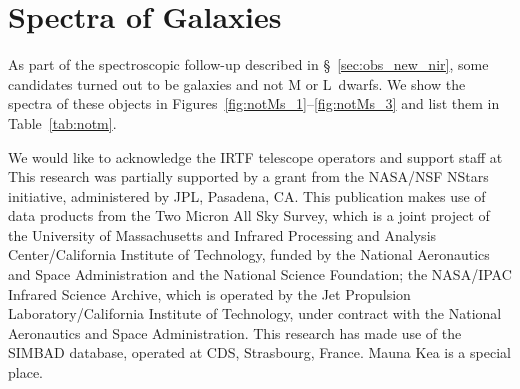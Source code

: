 \documentclass[12pt,preprint]{aastex}
\begin{document}
% 


\appendix
\section{Spectra of Galaxies}
\label{sec:galaxies}
As part of the spectroscopic follow-up described in \S~\ref{sec:obs_new_nir}, some candidates turned out to be galaxies and not M or L~dwarfs. We show the spectra of these objects in Figures~\ref{fig:notMs_1}--\ref{fig:notMs_3} and list them in Table~\ref{tab:notm}.

\acknowledgments
We would like to acknowledge the IRTF telescope operators
and support staff at 
This research was partially supported by a grant from the NASA/NSF
NStars initiative, administered by JPL, Pasadena, CA.  This publication makes use of data products from the Two Micron All Sky Survey, which is a joint project of the University of Massachusetts and Infrared Processing and Analysis
Center/California Institute of Technology, funded by the National Aeronautics and Space Administration and the National Science Foundation; the NASA/IPAC Infrared Science Archive, which is operated by the Jet Propulsion Laboratory/California Institute of Technology, under contract with the National Aeronautics and Space Administration.  This research has made use of the SIMBAD database, operated at CDS, Strasbourg, France.
Mauna Kea is a special place.
\end{document}
